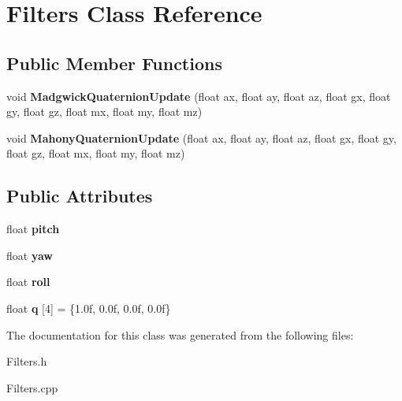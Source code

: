 \hypertarget{class_filters}{}\section{Filters Class Reference}
\label{class_filters}
\subsection*{Public Member Functions}
\begin{DoxyCompactItemize}
\item 
\mbox{\label{class_filters_a803ebcd6adb5c3cb765a321b0a8bd7fa}} 
void {\bfseries Madgwick\+Quaternion\+Update} (float ax, float ay, float az, float gx, float gy, float gz, float mx, float my, float mz)
\item 
\mbox{\label{class_filters_a0eb64d0ce636db7e7ca34e8b5da8d50a}} 
void {\bfseries Mahony\+Quaternion\+Update} (float ax, float ay, float az, float gx, float gy, float gz, float mx, float my, float mz)
\end{DoxyCompactItemize}
\subsection*{Public Attributes}
\begin{DoxyCompactItemize}
\item 
\mbox{\label{class_filters_aa8b3e816dd712cb6a4d34a8eb431162f}} 
float {\bfseries pitch}
\item 
\mbox{\label{class_filters_ab6c0b1114d4b6468dea6b77ebea2d17e}} 
float {\bfseries yaw}
\item 
\mbox{\label{class_filters_a8cbbce68157a4b3f14a85bdc9b9b1c1e}} 
float {\bfseries roll}
\item 
\mbox{\label{class_filters_a41fc34c7ed2a7036eb60473cbb6f2852}} 
float {\bfseries q} \mbox{[}4\mbox{]} = \{1.\+0f, 0.\+0f, 0.\+0f, 0.\+0f\}
\end{DoxyCompactItemize}


The documentation for this class was generated from the following files\+:\begin{DoxyCompactItemize}
\item 
Filters.\+h\item 
Filters.\+cpp\end{DoxyCompactItemize}
